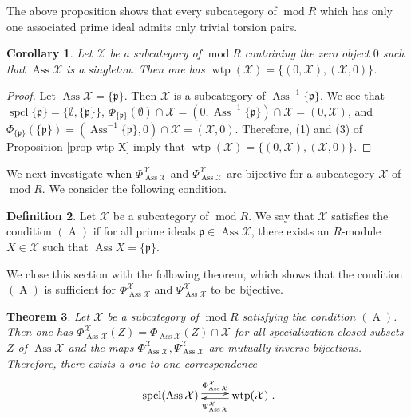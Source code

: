 \documentclass{amsart}
\newtheorem{thm}{Theorem}[section]
\newtheorem{cor}[thm]{Corollary}
\theoremstyle{definition}
\newtheorem{dfn}[thm]{Definition}
\theoremstyle{remark}
\def\AA{\operatorname{A}}
\def\Ass{\operatorname{Ass}}
\def\mod{\operatorname{mod}}
\def\p{\mathfrak{p}}
\def\spcl{\operatorname{spcl}}
\def\wtp{\operatorname{wtp}}
\def\X{\mathcal{X}}
\begin{document}
The above proposition shows that every subcategory of $\mod R$ which has only one associated prime ideal admits only trivial torsion pairs.

\begin{cor}\label{cor singleton}
Let $\X$ be a subcategory of $\mod R$ containing the zero object $0$ such that $\Ass\X$ is a singleton. Then one has $\wtp(\X)=\{(0,\X),(\X,0)\}$.
\end{cor}

\begin{proof}
Let $\Ass\X=\{\p\}$. Then $\X$ is a subcategory of $\Ass^{-1}\{\p\}$. We see that $\spcl\{\p\}=\{\emptyset,\{\p\}\}$, $\Phi_{\{\p\}}(\emptyset)\cap\X=(0,\Ass^{-1}\{\p\})\cap\X=(0,\X)$, and $\Phi_{\{\p\}}(\{\p\})=(\Ass^{-1}\{\p\},0)\cap\X=(\X,0)$. Therefore, (1) and (3) of Proposition \ref{prop wtp X} imply that $\wtp(\X)=\{(0,\X),(\X,0)\}$.
\end{proof}

We next investigate when $\Phi^\X_{\Ass\X}$ and $\Psi^\X_{\Ass\X}$ are bijective for a subcategory $\X$ of $\mod R$. We consider the following condition.

\begin{dfn}
Let $\X$ be a subcategory of $\mod R$. We say that $\X$ satisfies the condition $(\AA)$ if for all prime ideals $\p\in\Ass\X$, there exists an $R$-module $X\in\X$ such that $\Ass X=\{\p\}$.
\end{dfn}

We close this section with the following theorem, which shows that the condition $(\AA)$ is sufficient for $\Phi^\X_{\Ass\X}$ and $\Psi^\X_{\Ass\X}$ to be bijective.

\begin{thm}\label{thm A}
Let $\X$ be a subcategory of $\mod R$ satisfying the condition $(\AA)$. Then one has $\Phi^\X_{\Ass\X}(Z)=\Phi_{\Ass\X}(Z)\cap\X$ for all specialization-closed subsets $Z$ of $\Ass\X$ and the maps $\Phi^\X_{\Ass\X},\Psi^\X_{\Ass\X}$ are mutually inverse bijections. Therefore, there exists a one-to-one correspondence
\[\xymatrix{\spcl(\Ass\X)\ar@<0.5ex>[r]^-{\Phi^\X_{\Ass\X}}&\wtp(\X)\ar@<0.5ex>[l]^-{\Psi^\X_{\Ass\X}}}.\]
\end{thm}
\end{document}

